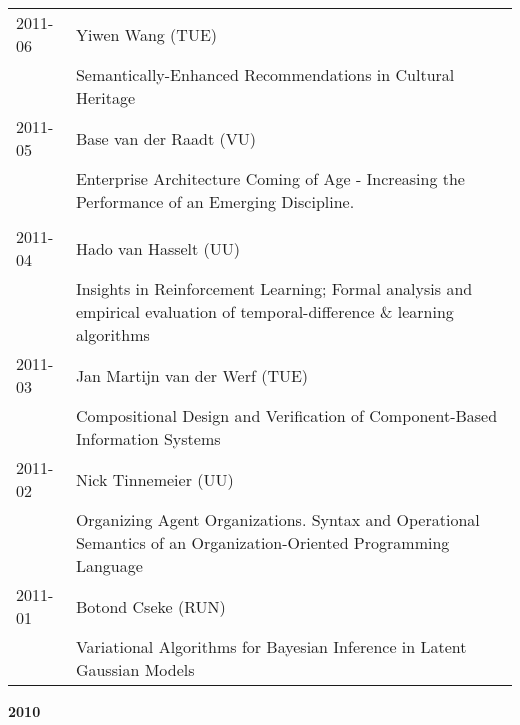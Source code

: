 \begin{longtable}{p{1.25cm}p{10.75cm}}
2011-06 & Yiwen Wang (TUE) \\& Semantically-Enhanced Recommendations in Cultural Heritage \\
2011-05 & Base van der Raadt (VU) \\& Enterprise Architecture Coming of Age - Increasing the Performance of an Emerging Discipline. \\
\\
2011-04 & Hado van Hasselt (UU) \\& Insights in Reinforcement Learning; Formal analysis and empirical \newline evaluation of temporal-difference \& learning algorithms \\
2011-03 & Jan Martijn van der Werf (TUE) \\& Compositional Design and Verification of Component-Based Information Systems \\
2011-02 & Nick Tinnemeier (UU) \\& Organizing Agent Organizations. Syntax and Operational Semantics of an Organization-Oriented Programming Language \\
2011-01 & Botond Cseke (RUN) \\& Variational Algorithms for Bayesian Inference in Latent Gaussian Models \\
\end{longtable}

\begin{center}
	\large{\textbf{2010}}
\end{center}

